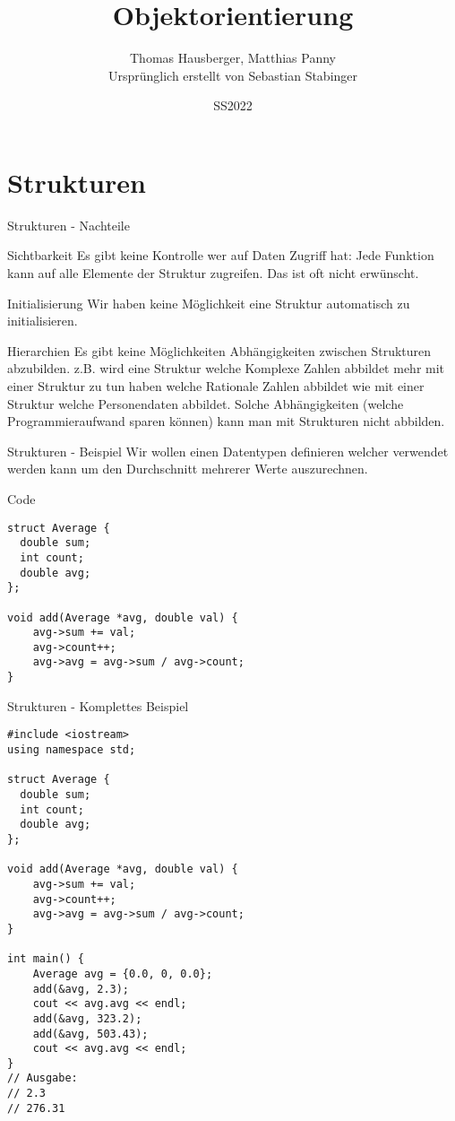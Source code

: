 \documentclass[presentation]{beamer}
\author{Thomas Hausberger, Matthias Panny \\ Ursprünglich erstellt von Sebastian Stabinger}
\date{SS2022}
\title{Objektorientierung}
\begin{document}
\maketitle

\section{Strukturen}
\label{sec:org09a0645}
\begin{frame}[label={sec:org0206876}]{Strukturen - Nachteile}
\begin{block}{Sichtbarkeit}
Es gibt keine Kontrolle wer auf Daten Zugriff hat: Jede Funktion kann
auf \alert{alle Elemente} der Struktur zugreifen. Das ist oft nicht
erwünscht.
\end{block}
\begin{block}{Initialisierung}
Wir haben keine Möglichkeit eine Struktur \alert{automatisch zu
initialisieren}.
\end{block}
\begin{block}{Hierarchien}
Es gibt keine Möglichkeiten \alert{Abhängigkeiten zwischen Strukturen
abzubilden}. z.B. wird eine Struktur welche Komplexe Zahlen abbildet
mehr mit einer Struktur zu tun haben welche Rationale Zahlen abbildet
wie mit einer Struktur welche Personendaten abbildet. Solche
Abhängigkeiten (welche Programmieraufwand sparen können) kann man mit
Strukturen nicht abbilden.
\end{block}
\end{frame}
\begin{frame}[label={sec:orgec2f8eb},fragile]{Strukturen - Beispiel}
 Wir wollen einen Datentypen definieren welcher verwendet werden kann
um den Durchschnitt mehrerer Werte auszurechnen.
\begin{exampleblock}{Code}
\begin{verbatim}
struct Average {
  double sum;
  int count;
  double avg;
};

void add(Average *avg, double val) {
    avg->sum += val;
    avg->count++;
    avg->avg = avg->sum / avg->count;
}
\end{verbatim}
\end{exampleblock}
\end{frame}
\begin{frame}[label={sec:orgbe40421},fragile]{Strukturen - Komplettes Beispiel}
 \begin{verbatim}
#include <iostream>
using namespace std;

struct Average {
  double sum;
  int count;
  double avg;
};

void add(Average *avg, double val) {
    avg->sum += val;
    avg->count++;
    avg->avg = avg->sum / avg->count;
}

int main() {
    Average avg = {0.0, 0, 0.0};
    add(&avg, 2.3);
    cout << avg.avg << endl;
    add(&avg, 323.2);
    add(&avg, 503.43);
    cout << avg.avg << endl;
}
// Ausgabe:
// 2.3
// 276.31
\end{verbatim}
\end{frame}
\end{document}
